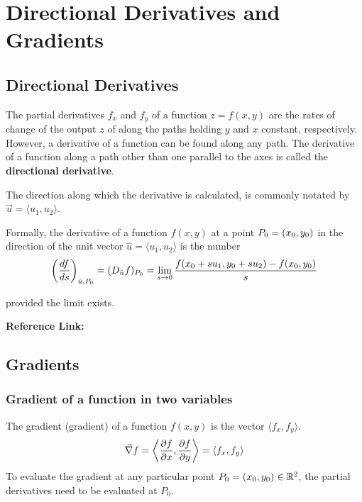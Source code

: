 \section{Directional Derivatives and Gradients}

\subsection{Directional Derivatives}

The partial derivatives $f_x$ and $f_y$ of a function $z = f(x, y)$ are the rates of change of the output $z$ of along the
paths holding $y$ and $x$ constant, respectively. However, a derivative of a function can be found along any path.
The derivative of a function along a path other than one parallel to the axes is called the \textbf{directional derivative}.

The direction along which the derivative is calculated, is commonly notated by $\vec{u} = \langle u_1, u_2 \rangle$.

Formally, the derivative of a function $f(x, y)$ at a point $P_0 = (x_0, y_0)$ in the direction of the unit vector
$\hat{u} = \langle u_1, u_2 \rangle$ is the number
\begin{equation}
    \left( \frac{df}{ds} \right)_{\hat{u}, P_0} = (D_{\hat{u}}f)_{P_0} = \lim_{s \to 0} \frac{f(x_0 + su_1, y_0 + su_2) - f(x_0, y_0)}{s}
\end{equation}

provided the limit exists.

\textbf{Reference Link:}


\subsection{Gradients}

\subsubsection{Gradient of a function in two variables}
The gradient (gradient) of a function $f(x, y)$ is the vector $\langle f_x, f_y \rangle$.
\begin{equation}
    \vec{\nabla} f = \left\langle \frac{\partial f}{\partial x}, \frac{\partial f}{\partial y} \right\rangle = \langle f_x, f_y\rangle
\end{equation}
To evaluate the gradient at any particular point $P_0 = (x_0, y_0) \in \mathbb{R}^2$, the partial derivatives need to be evaluated
at $P_0$.

